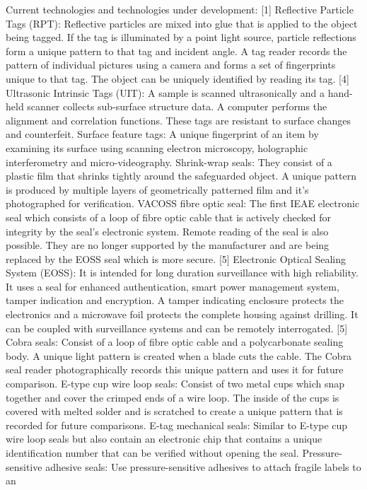 \documentclass[twocolumn,a4paper]{article}
\begin{document}
Current technologies and technologies under development: [1]
Reflective Particle Tags (RPT): Reflective particles are mixed into glue that is applied to the
object being tagged. If the tag is illuminated by a point light source, particle reflections form a
unique pattern to that tag and incident angle. A tag reader records the pattern of individual
pictures using a camera and forms a set of fingerprints unique to that tag. The object can be
uniquely identified by reading its tag. [4]
Ultrasonic Intrinsic Tags (UIT): A sample is scanned ultrasonically and a hand-held scanner
collects sub-surface structure data. A computer performs the alignment and correlation
functions. These tags are resistant to surface changes and counterfeit.
Surface feature tags: A unique fingerprint of an item by examining its surface using scanning
electron microscopy, holographic interferometry and micro-videography.
Shrink-wrap seals: They consist of a plastic film that shrinks tightly around the safeguarded
object. A unique pattern is produced by multiple layers of geometrically patterned film and it’s
photographed for verification.
VACOSS fibre optic seal: The first IEAE electronic seal which consists of a loop of fibre optic cable
that is actively checked for integrity by the seal’s electronic system. Remote reading of the seal is
also possible. They are no longer supported by the manufacturer and are being replaced by the
EOSS seal which is more secure. [5]
Electronic Optical Sealing System (EOSS): It is intended for long duration surveillance with high
reliability. It uses a seal for enhanced authentication, smart power management system, tamper
indication and encryption. A tamper indicating enclosure protects the electronics and a 
microwave foil protects the complete housing against drilling. It can be coupled with surveillance
systems and can be remotely interrogated. [5]
Cobra seals: Consist of a loop of fibre optic cable and a polycarbonate sealing body. A unique
light pattern is created when a blade cuts the cable. The Cobra seal reader photographically
records this unique pattern and uses it for future comparison.
E-type cup wire loop seals: Consist of two metal cups which snap together and cover the
crimped ends of a wire loop. The inside of the cups is covered with melted solder and is
scratched to create a unique pattern that is recorded for future comparisons.
E-tag mechanical seals: Similar to E-type cup wire loop seals but also contain an electronic chip
that contains a unique identification number that can be verified without opening the seal.
Pressure-sensitive adhesive seals: Use pressure-sensitive adhesives to attach fragile labels to an
\end{document}
